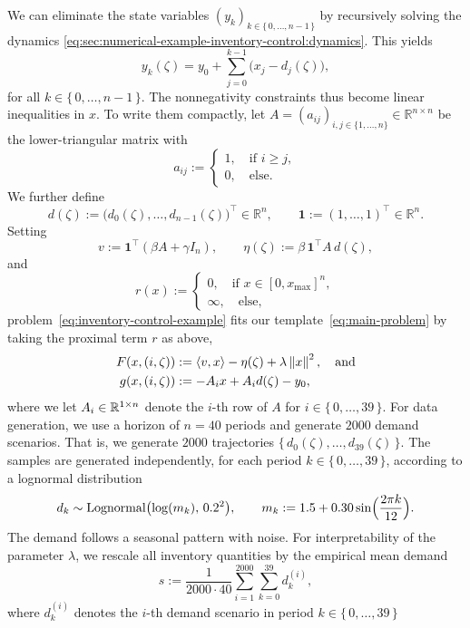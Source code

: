 We can eliminate the state variables $(y_k)_{k\in\{\, 0,\dots,n-1 \,\}}$ by
recursively solving the dynamics \eqref{eq:sec:numerical-example-inventory-control:dynamics}.
This yields
\[
    y_k(\zeta) = y_0 + \sum_{j=0}^{k-1}\bigl(x_j - d_j(\zeta)\bigr),
\]
for all $k\in\{\, 0,\dots,n-1 \,\}$.
The nonnegativity constraints thus become linear inequalities in $x$.
To write them compactly, let
$A = (a_{ij})_{i,j\in\{1,\dots,n\}} \in \mathbb{R}^{n\times n}$
be the lower-triangular matrix with
\[
    a_{ij} := \begin{cases}
        1, \quad\text{if $i \geq j$}, \\
        0, \quad\text{else.}
    \end{cases}
\]
We further define
\[
    d(\zeta) := \bigl(d_0(\zeta),\dots,d_{n-1}(\zeta)\bigr)^\top \in \mathbb{R}^n,
    \qquad
    \mathbf{1} := (1,\dots,1)^\top \in \mathbb{R}^n.
\]
Setting
\[
    v := \mathbf{1}^\top(\beta A + \gamma I_n),
    \qquad
    \eta(\zeta) := \beta\,\mathbf{1}^\top A\, d(\zeta),
\]
and
\[
    r(x) := \begin{cases}
        0, \quad\text{if $x \in [0, x_{\max}]^n$}, \\
        \infty, \quad\text{else,}
    \end{cases}
\]
problem~\eqref{eq:inventory-control-example} fits our template~\eqref{eq:main-problem} by
taking the proximal term $r$ as above,
\begin{align*}
    F(x,(i, \zeta)) &:= \langle v, x \rangle - \eta(\zeta) + \lambda \left\lVert x\right\rVert^2,  \quad\text{and} \\
    g(x, (i, \zeta)) &:= -A_i x + A_i d(\zeta) - y_0,
\end{align*}
where we let $A_i\in\mathbb{R}^{1\times n}$ denote the $i$-th row of $A$ for $i\in\{\, 0,\dots,39 \,\}$.
For data generation, we use a horizon of $n = 40$
periods and generate $2000$ demand scenarios.
That is, we generate $2000$ trajectories $\{\, d_0(\zeta),\dots,d_{39}(\zeta) \,\}$.
The samples are generated independently, for each period $k \in \{\, 0,\dots,39 \,\}$,
according to a lognormal distribution
\[
    d_k \sim \operatorname{Lognormal}\bigl(\log(m_k),\,0.2^2\bigr),
    \qquad
    m_k := 1.5 + 0.30 \sin\Bigl(\frac{2\pi k}{12}\Bigr).
\]
The demand follows a seasonal pattern with noise.
For interpretability of the parameter $\lambda$, we
rescale all inventory quantities by the empirical mean demand
\[
    s := \frac{1}{2000\cdot 40}\sum_{i=1}^{2000}\sum_{k=0}^{39} d_k^{(i)},
\]
where $d_k^{(i)}$ denotes the $i$-th demand scenario in period $k\in\{\, 0,\dots,39 \,\}$

